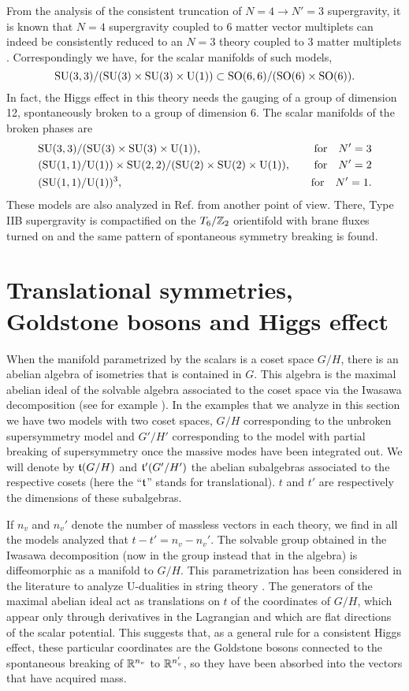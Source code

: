 \documentclass[a4paper,12pt]{article}
\begin{document}
  From the analysis of the
consistent truncation of $N=4\rightarrow N'=3$ supergravity, it is
known that $N=4$ supergravity coupled to 6 matter vector
multiplets can indeed be consistently reduced to an $N=3$ theory
coupled to 3 matter multiplets \cite{adfl1}. Correspondingly we
have, for the scalar manifolds of such models,
$$\mathrm{SU}(3,3)/(\mathrm{SU}(3)\times\mathrm{SU}(3)\times\mathrm{U}(1))\subset\mathrm{SO}(6,6)/(\mathrm{SO}(6)\times\mathrm{SO}(6)).$$
In fact,   the Higgs effect in this theory needs the gauging of a
group of dimension 12, spontaneously broken to a group of
dimension 6.
 The
scalar manifolds of the broken phases are
\begin{eqnarray*}& \mathrm{SU}(3,3)/(\mathrm{SU}(3)\times\mathrm{SU}(3)\times\mathrm{U}(1)),\quad
&\mathrm{for}\quad N'=3\\&
(\mathrm{SU}(1,1)/\mathrm{U}(1))\times\mathrm{SU}(2,2)/(\mathrm{SU}(2)\times\mathrm{SU}(2)\times\mathrm{U}(1)),\quad
&\mathrm{for}\quad N'=2\\& (\mathrm{SU}(1,1)/\mathrm{U}(1))^3,\quad
&\mathrm{for}\quad N'=1.\end{eqnarray*}  These models are also
analyzed in Ref. \cite{fp,kst} from another point of view. There,
Type IIB supergravity is compactified on the $T_6/\mathbb{Z}_2$
orientifold with brane fluxes turned on and the same pattern of
spontaneous symmetry breaking is found.




\section{Translational symmetries, Goldstone bosons and Higgs effect}

When the manifold parametrized by the scalars is a coset space
$G/H$, there is an abelian  algebra of isometries that is
contained in $G$. This algebra is the maximal abelian ideal of the
solvable algebra associated to the coset space via the Iwasawa
decomposition (see for example \cite{he}).  In the examples that
we analyze in this section we have two models with two coset
spaces, $G/H$ corresponding to the unbroken supersymmetry model
and $G'/H'$ corresponding to the model with partial breaking of
supersymmetry once  the massive modes have been integrated out.
We will denote by $\mathfrak{t}(G/H)$ and $\mathfrak{t}'(G'/H')$ the abelian
subalgebras associated to the respective cosets (here the
``$\mathfrak{t}$'' stands for translational). $t$ and $t'$ are respectively
the dimensions of these  subalgebras.

If $n_v$ and $n_v'$ denote the number of massless  vectors in each
theory, we find  in  all the models analyzed that $t-t'=n_v-n_v'$.
The solvable group obtained in the Iwasawa decomposition (now in
the group instead that in the algebra) is diffeomorphic as a
manifold to $G/H$.  This parametrization has been considered in
the literature to analyze U-dualities in string theory
\cite{adfft,lps,cj}. The generators of the maximal abelian ideal
act as  translations on $t$ of the coordinates of $G/H$, which
appear only through derivatives in the Lagrangian and
 which are flat directions of  the scalar potential. This suggests that, as a general
rule for a consistent Higgs effect, these particular coordinates
are the Goldstone bosons connected to the spontaneous breaking of
$\mathbb{R}^{n_v}$ to $\mathbb{R}^{n_v'}$, so they have been absorbed into the
vectors that have acquired mass.
\end{document}
